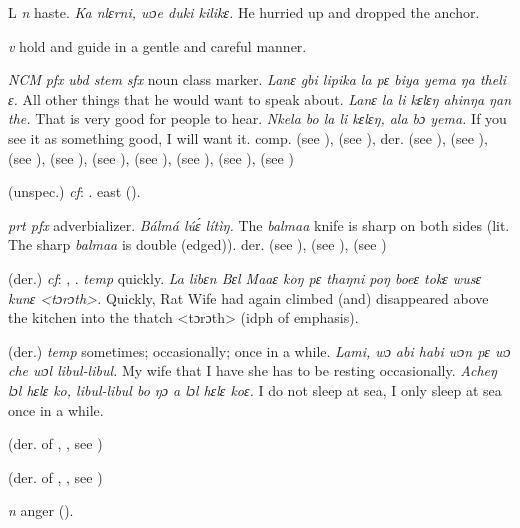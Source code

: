 \begin{letter}{L}
 \textit{n} haste. \textit{Ka nlɛrni, wɔe duki kilikɛ.} He hurried up and dropped the anchor.

 \textit{v} hold and guide in a gentle and careful manner.

 \textit{NCM} \textit{pfx} \textit{ubd stem} \textit{sfx} noun class marker. \textit{Lanɛ gbi lipika la pɛ biya yema ŋa theli ɛ.} All other things that he would want to speak about. \textit{Lanɛ la li kɛlɛŋ ahinŋa ŋan the.} That is very good for people to hear. \textit{Nkela bo la li kɛlɛŋ, ala bɔ yema.} If you see it as something good, I will want it. comp.  (see ),  (see ), der.  (see ),  (see ),  (see ),  (see ),  (see ),  (see ),  (see ),  (see ),  (see )

 (unspec.) \textit{cf}: . east (\citealt{Pichl1967}). 

 \textit{prt pfx} adverbializer. \textit{Bálmá lúɛ́ lítìŋ.} The \textit{balmaa} knife is sharp on both sides (lit. The sharp \textit{balmaa} is double (edged)). der.  (see ),  (see ),  (see )

 (der.) \textit{cf}: , . \textit{temp} quickly. \textit{La libɛn Bɛl Maaɛ koŋ pɛ thaŋni poŋ boeɛ tokɛ wusɛ kunɛ <tɔrɔth>.} Quickly, Rat Wife had again climbed (and) disappeared above the kitchen into the thatch <tɔrɔth> (idph of emphasis). 

  (der.) \textit{temp} sometimes; occasionally; once in a while. \textit{Lami, wɔ abi habi wɔn pɛ wɔ che wɔl libul-libul.} My wife that I have she has to be resting occasionally. \textit{Acheŋ lɔl hɛlɛ ko, libul-libul bo ŋɔ a lɔl hɛlɛ koɛ.} I do not sleep at sea, I only sleep at sea once in a while. 

 (der. of , , see ) 

 (der. of , , see ) 

 \textit{n} anger (\citealt{Pichl1967}).


\end{letter}
